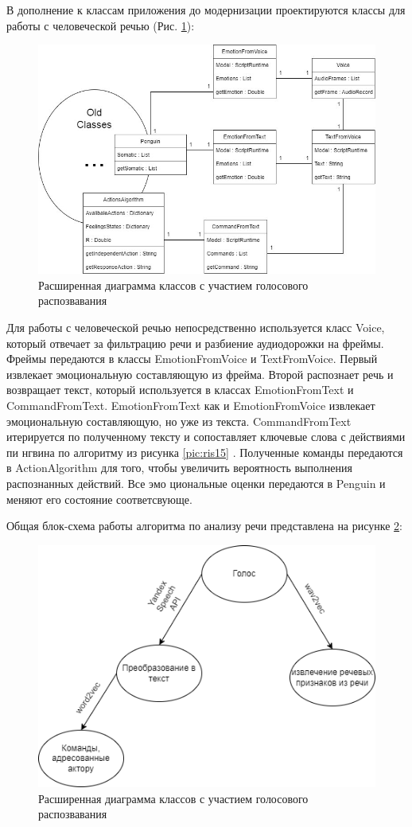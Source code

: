 В дополнение к классам приложения до модернизации проектируются классы для работы с человеческой речью (Рис. \ref{pic:ncmodel0}):

\begin{figure}[!h]
\includegraphics[width=0.75\columnwidth]{./img/ncmodel0.jpg}
\centering
\caption{Расширенная диаграмма классов с участием голосового распозвавания}
\label{pic:ncmodel0}
\end{figure}

Для работы с человеческой речью непосредственно используется класс Voice, который отвечает за фильтрацию речи и разбиение аудиодорожки на фреймы. 
Фреймы передаются в классы EmotionFromVoice   
и TextFromVoice. Первый извлекает эмоциональную составляющую из фрейма. Второй распознает речь   
и возвращает текст, который используется в классах EmotionFromText и CommandFromText.   
EmotionFromText как и EmotionFromVoice извлекает эмоциональную составляющую, но уже из текста. 
CommandFromText итерируется по полученному тексту и сопоставляет ключевые слова с действиями пи  
нгвина по алгоритму из рисунка \ref{pic:ris15} . Полученные команды передаются в   
ActionAlgorithm для того, чтобы увеличить вероятность выполнения распознанных действий. Все эмо  
циональные оценки передаются в Penguin и меняют его состояние соответсвующе.

Общая блок-схема работы алгоритма по анализу речи представлена на рисунке \ref{pic:block_schema}: 

\begin{figure}[!h]
\includegraphics[width=0.75\columnwidth]{./img/block_schema.png}
\centering
\caption{Расширенная диаграмма классов с участием голосового распозвавания}
\label{pic:block_schema}
\end{figure}

